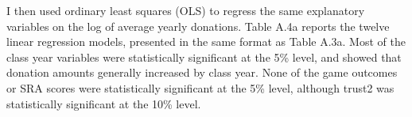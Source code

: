 \documentclass[12pt]{article}
\begin{document}
I then used ordinary least squares (OLS) to regress the same explanatory variables on the log of average yearly donations. Table A.4a reports the twelve linear regression models, presented in the same format as Table A.3a. Most of the class year variables were statistically significant at the 5\% level, and showed that donation amounts generally increased by class year. None of the game outcomes or SRA scores were statistically significant at the 5\% level, although trust2 was statistically significant at the 10\% level.

\end{document}
